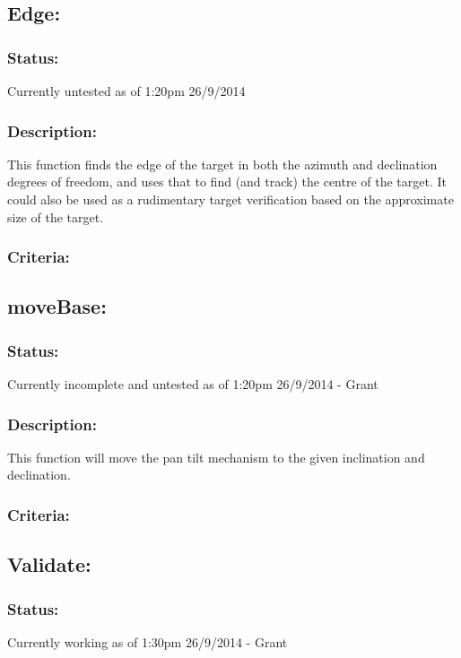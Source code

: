 \documentclass[]{article}
\begin{document}
\subsection{Edge:}
\subsubsection{Status:}
Currently untested as of 1:20pm 26/9/2014

\subsubsection{Description:}
This function finds the edge of the target in both the azimuth and declination degrees of freedom, and uses that to find (and track) the centre of the target. It could also be used as a rudimentary target verification based on the approximate size of the target.

\subsubsection{Criteria:}


\subsection{moveBase:}
\subsubsection{Status:}
Currently incomplete and untested as of 1:20pm 26/9/2014 - Grant

\subsubsection{Description:} 
This function will move the pan tilt mechanism to the given inclination and declination.

\subsubsection{Criteria:}

\subsection{Validate:}
\subsubsection{Status:}
Currently working as of 1:30pm 26/9/2014 - Grant
\end{document}
